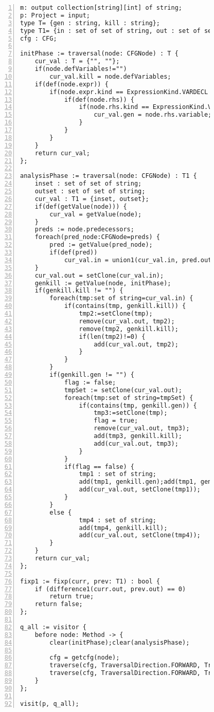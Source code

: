 \begin{figure}[ht!]
\begin{lstlisting}[numbers=left, tabsize=4, escapechar=@, caption={Local may alias},label={lst:lma-code}, lastline = 54] 
m: output collection[string][int] of string;
p: Project = input;
type T= {gen : string, kill : string};
type T1= {in : set of set of string, out : set of set of string};
cfg : CFG;

initPhase := traversal(node: CFGNode) : T {
	cur_val : T = {"", ""};
	if(node.defVariables!="")
		cur_val.kill = node.defVariables;
	if(def(node.expr)) {
		if(node.expr.kind == ExpressionKind.VARDECL || node.expr.kind == ExpressionKind.ASSIGN) {
			if(def(node.rhs)) {
				if(node.rhs.kind == ExpressionKind.VARACCESS) {
					cur_val.gen = node.rhs.variable;
				}
			}
		}
	}
	return cur_val;
};

analysisPhase := traversal(node: CFGNode) : T1 {
	inset : set of set of string;
	outset : set of set of string;
	cur_val : T1 = {inset, outset};
	if(def(getValue(node))) {
		cur_val = getValue(node);
	}	
	preds := node.predecessors;
	foreach(pred_node:CFGNode=preds) {	
		pred := getValue(pred_node);
		if(def(pred))
			cur_val.in = union1(cur_val.in, pred.out);
	}
	cur_val.out = setClone(cur_val.in);
	genkill := getValue(node, initPhase);
	if(genkill.kill != "") {
		foreach(tmp:set of string=cur_val.in) {
			if(contains(tmp, genkill.kill)) {
				tmp2:=setClone(tmp);
				remove(cur_val.out, tmp2);
				remove(tmp2, genkill.kill);
				if(len(tmp2)!=0) {
					add(cur_val.out, tmp2);
				}
			}
		}
		if(genkill.gen != "") {
			flag := false;
			tmpSet := setClone(cur_val.out);
			foreach(tmp:set of string=tmpSet) {
				if(contains(tmp, genkill.gen)) {
					tmp3:=setClone(tmp);
					flag = true;
					remove(cur_val.out, tmp3);
					add(tmp3, genkill.kill);
					add(cur_val.out, tmp3);
				}
			}
			if(flag == false) {
				tmp1 : set of string;
				add(tmp1, genkill.gen);add(tmp1, genkill.kill);
				add(cur_val.out, setClone(tmp1));
			}
		}
		else {
				tmp4 : set of string;
				add(tmp4, genkill.kill);
				add(cur_val.out, setClone(tmp4));
		}
	}
	return cur_val;
};

fixp1 := fixp(curr, prev: T1) : bool {
	if (difference1(curr.out, prev.out) == 0)
		return true;	
	return false;
};

q_all := visitor {
	before node: Method -> {
		clear(initPhase);clear(analysisPhase);

		cfg = getcfg(node);
		traverse(cfg, TraversalDirection.FORWARD, TraversalKind.HYBRID, initPhase);
		traverse(cfg, TraversalDirection.FORWARD, TraversalKind.HYBRID, analysisPhase, fixp1);
	}
};

visit(p, q_all);
\end{lstlisting}
\end{figure}